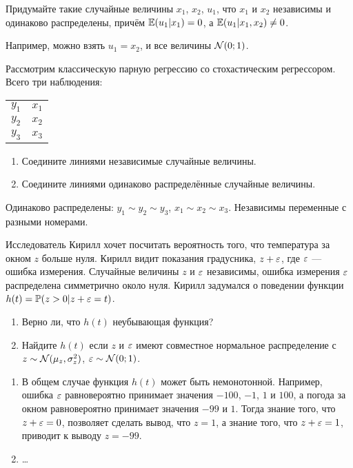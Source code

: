 \begin{problem}
  Придумайте такие случайные величины $x_1$, $x_2$, $u_1$, что $x_1$ и $x_2$ независимы и одинаково распределены, причём $\mathbb{E}(u_1|x_1)=0$, а $\mathbb{E}(u_1|x_1, x_2) \neq 0$.
\begin{sol}
  Например, можно взять $u_1=x_2$, и все величины $\mathcal{N}(0;1)$.
\end{sol}
\end{problem}

\begin{problem}
 Рассмотрим классическую парную регрессию со стохастическим регрессором. Всего три наблюдения:

 \begin{tabular}{rr}
 \toprule
 $y_1$ & $x_1$ \\
 $y_2$ & $x_2$ \\
 $y_3$ & $x_3$ \\
 \bottomrule
 \end{tabular}

\begin{enumerate}
 \item Соедините линиями независимые случайные величины.
 \item Соедините линиями одинаково распределённые случайные величины.
\end{enumerate}

\begin{sol}
  Одинаково распределены: $y_1 \sim y_2 \sim y_3$, $x_1 \sim x_2 \sim x_3$. Независимы переменные с разными номерами.
\end{sol}
\end{problem}


\begin{problem}
Исследователь Кирилл хочет посчитать вероятность того, что температура за окном $z$ больше нуля.
Кирилл видит показания градусника, $z + \varepsilon$, где $\varepsilon$ — ошибка измерения. 
Случайные величины $z$ и $\varepsilon$ независимы, 
ошибка измерения $\varepsilon$ распределена симметрично около нуля.
Кирилл задумался о поведении функции $h(t)=\mathbb{P}(z > 0 | z + \varepsilon = t)$. 

  \begin{enumerate}
      \item Верно ли, что $h(t)$ неубывающая функция?
      \item Найдите $h(t)$ если $z$ и $\varepsilon$ имеют совместное нормальное распределение с $z\sim \mathcal{N}(\mu_z, \sigma^2_z)$, $\varepsilon\sim \mathcal{N}(0;1)$.
  \end{enumerate}
  \begin{sol}
  \begin{enumerate}
    \item В общем случае функция $h(t)$ может быть немонотонной. 
      Например, ошибка $\varepsilon$ равновероятно принимает значения $-100$, $-1$, $1$ и $100$, 
      а погода за окном равновероятно принимает значения $-99$ и $1$.
      Тогда знание того, что $z+\varepsilon=0$, позволяет сделать вывод, что $z=1$,
      а знание того, что $z+\varepsilon = 1$, приводит к выводу $z=-99$.
    \item \ldots
  \end{enumerate}
\end{sol}
\end{problem}




